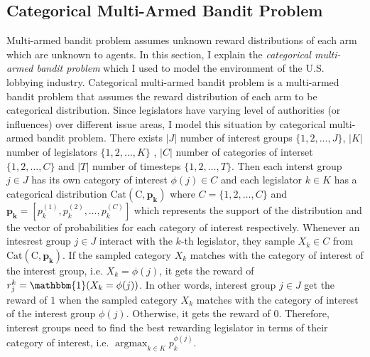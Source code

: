 \documentclass{article}
\begin{document}
\subsection{\large{ 
Categorical Multi-Armed Bandit Problem}} \label{vanilla}

Multi-armed bandit problem 
assumes unknown reward distributions 
of each arm
which are unknown to agents.
In this section, I explain 
the \textit{categorical multi-armed bandit problem}
which I used to model the 
environment of the U.S. lobbying industry.
Categorical multi-armed bandit problem
is a multi-armed bandit problem
that assumes the reward distribution of each arm to be categorical distribution.
Since legislators have varying level of authorities (or influences) 
over different issue areas,
I model this situation by categorical multi-armed bandit problem. There exists $|J|$ number of interest groups 
$\{1, 2, \hdots, J\}$, $|K|$ number of legislators $\{1, 2, \hdots, K\}$ 
, $|C|$ number of categories of interset $\{1,2, \hdots, C\}$ and
$|T|$ number of timesteps $\{1,2, \hdots, T\}$.  
Then each interst group $j \in J$ has its 
own category of interest $\phi(j) \in C$ and
each legislator $k \in K$ has a categorical distribution 
$\operatorname{Cat(C, \mathbf{p_k})}$ where
$C=\{1,2,\hdots, C\}$ and $\mathbf{p_k} = [p_k^{(1)}, p_k^{(2)}, \hdots, p_k^{(C)}]$
which represents the support of the distribution
and the vector of probabilities for each category of interest respectively.
Whenever an intesrest group $j \in J$ interact with the $k$-th legislator, they
sample $X_k \in C$ from $\operatorname{Cat(C, \mathbf{p_k})}$.
If the sampled category $X_k$ matches with the category of interest of the interest group, i.e. 
$X_k = \phi(j)$,
it gets the reward of $r_j^k = \mathbbm{1}(X_{k} = \phi(j))$. 
In other words, 
interest group $j \in J$
get the reward of $1$
when the sampled category $X_k$ matches with the category of interest of the interest group $\phi(j)$.
Otherwise, it gets the reward of $0$.
Therefore, interest groups 
need to find the best rewarding 
legislator in terms of their category of interest, i.e. 
$\operatorname{argmax}_{k \in K} p_k^{\phi(j)}$.
\end{document}
